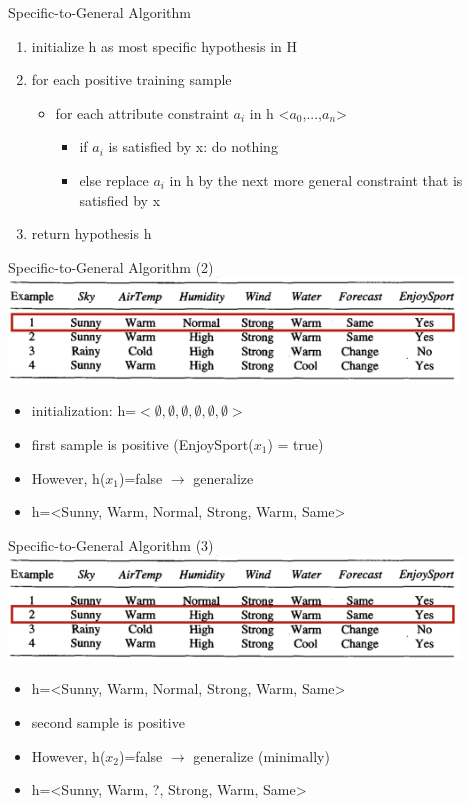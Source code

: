 \documentclass{beamer}
\begin{document}
\begin{frame}{Specific-to-General Algorithm}
\begin{enumerate}
\item initialize h as most specific hypothesis in H
\item for each positive training sample 
	\begin{itemize}
	\item for each attribute constraint $a_i$ in h <$a_0$,...,$a_n$>
    	\begin{itemize}
    	\item if $a_i$ is satisfied by x: do nothing
        \item else replace $a_i$ in h by the next more general constraint that is satisfied by x
    	\end{itemize}
	\end{itemize}
\item return hypothesis h
\end{enumerate}
\end{frame}

\begin{frame}{Specific-to-General Algorithm (2)}
\centering
\includegraphics[width=0.9\textwidth]{enjoysport_examples_1}
\begin{itemize}
\item initialization: h=$<\emptyset,\emptyset,\emptyset,\emptyset,\emptyset,\emptyset>$
\item first sample is positive (EnjoySport($x_1$) = true)
\item However, h($x_1$)=false $\rightarrow$ generalize
\item h=<Sunny, Warm, Normal, Strong, Warm, Same> %
\end{itemize}
\end{frame}

\begin{frame}{Specific-to-General Algorithm (3)}
\centering
\includegraphics[width=0.9\textwidth]{enjoysport_examples_2}
\begin{itemize}
\item h=<Sunny, Warm, Normal, Strong, Warm, Same>
\item second sample is positive
\item However, h($x_2$)=false $\rightarrow$ generalize (minimally)
\item h=<Sunny, Warm, ?, Strong, Warm, Same> %
\end{itemize}
\end{frame}
\end{document}
